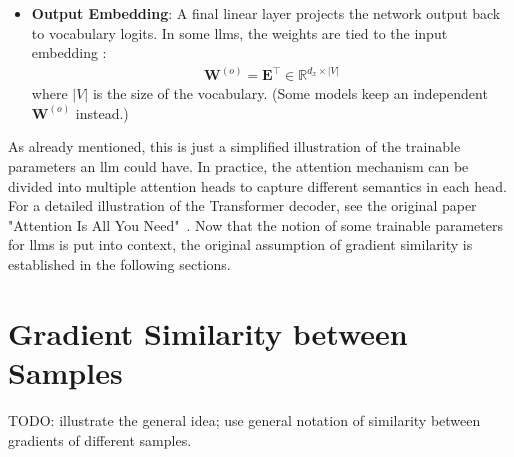 \begin{itemize}
    \item \textbf{Output Embedding}: A final linear layer projects the network output back to vocabulary logits. In some \acrshort{llm}s, the weights are tied to the input embedding \cite{press2017usingoutputembeddingimprove}:
          \begin{align*}
              \mathbf{W}^{(o)}=\mathbf{E}^{\!\top}\in\mathbb{R}^{d_x \times |V|}
          \end{align*}
          where $|V|$ is the size of the vocabulary. (Some models keep an independent $\mathbf{W}^{(o)}$ instead.)
\end{itemize}
As already mentioned, this is just a simplified illustration of the trainable parameters an \acrshort{llm} could have. In practice, the attention mechanism can be divided into multiple attention heads to capture different semantics in each head. For a detailed illustration of the Transformer decoder, see the original paper "Attention Is All You Need"~\cite{vaswani2023attentionneed}. Now that the notion of some trainable parameters for \acrlong{llm}s is put into context, the original assumption of gradient similarity is established in the following sections.

\section{Gradient Similarity between Samples}
TODO: illustrate the general idea; use general notation of similarity between gradients of different samples.


